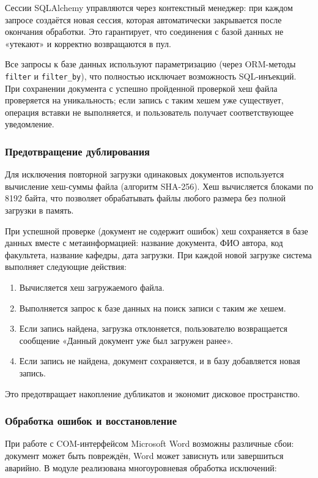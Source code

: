 Сессии SQLAlchemy управляются через контекстный менеджер: при каждом запросе создаётся новая сессия, которая автоматически закрывается после окончания обработки. Это гарантирует, что соединения с базой данных не «утекают» и корректно возвращаются в пул.

Все запросы к базе данных используют параметризацию (через ORM-методы \texttt{filter} и \texttt{filter\_by}), что полностью исключает возможность SQL-инъекций. При сохранении документа с успешно пройденной проверкой хеш файла проверяется на уникальность; если запись с таким хешем уже существует, операция вставки не выполняется, и пользователь получает соответствующее уведомление.

\subsubsection{Предотвращение дублирования}

Для исключения повторной загрузки одинаковых документов используется вычисление хеш-суммы файла (алгоритм SHA-256). Хеш вычисляется блоками по 8192 байта, что позволяет обрабатывать файлы любого размера без полной загрузки в память.

При успешной проверке (документ не содержит ошибок) хеш сохраняется в базе данных вместе с метаинформацией: название документа, ФИО автора, код факультета, название кафедры, дата загрузки. При каждой новой загрузке система выполняет следующие действия:

\begin{enumerate}
	\item Вычисляется хеш загружаемого файла.
	\item Выполняется запрос к базе данных на поиск записи с таким же хешем.
	\item Если запись найдена, загрузка отклоняется, пользователю возвращается сообщение «Данный документ уже был загружен ранее».
	\item Если запись не найдена, документ сохраняется, и в базу добавляется новая запись.
\end{enumerate}

Это предотвращает накопление дубликатов и экономит дисковое пространство.

\subsubsection{Обработка ошибок и восстановление}

При работе с COM-интерфейсом Microsoft Word возможны различные сбои: документ может быть повреждён, Word может зависнуть или завершиться аварийно. В модуле реализована многоуровневая обработка исключений:

